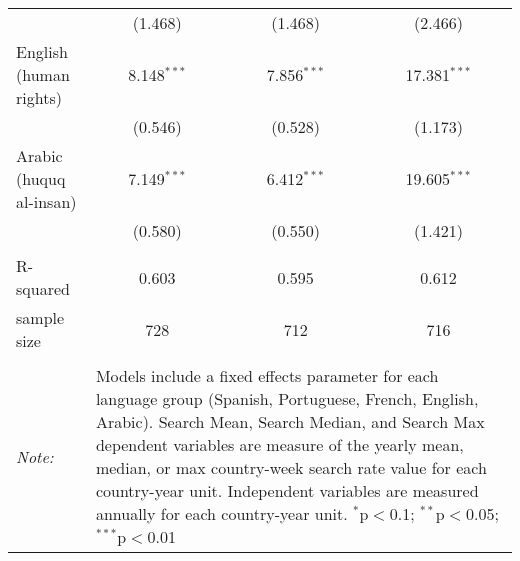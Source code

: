 \begin{table}[!htbp]
\begin{tabular}{@{\extracolsep{5pt}}lccc}
  & (1.468) & (1.468) & (2.466) \\ 
  English (human rights) & 8.148$^{***}$ & 7.856$^{***}$ & 17.381$^{***}$ \\ 
  & (0.546) & (0.528) & (1.173) \\ 
  Arabic (huquq al-insan) & 7.149$^{***}$ & 6.412$^{***}$ & 19.605$^{***}$ \\ 
  & (0.580) & (0.550) & (1.421) \\ 
 \hline \\[-1.8ex] 
R-squared  & 0.603 & 0.595 & 0.612 \\ 
sample size  & 728 & 712 & 716 \\ 
\hline 
\hline \\[-1.8ex] 
\textit{Note:}  & \multicolumn{3}{l}{\parbox[t]{8cm}{Models include a fixed effects parameter for each language group (Spanish, Portuguese, French, English, Arabic). Search Mean, Search Median, and Search Max dependent variables are measure of the yearly mean, median, or max country-week search rate value for each country-year unit. Independent variables are measured annually for each country-year unit. $^{*}$p$<$0.1; $^{**}$p$<$0.05; $^{***}$p$<$0.01}} \\ 
\end{tabular} 
\end{table} 
